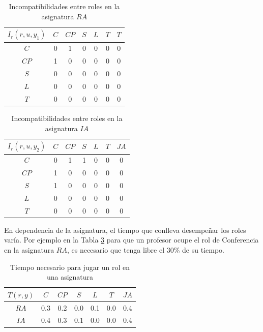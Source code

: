 \begin{table}[H]
	\centering
	\caption{Incompatibilidades entre roles en la asignatura $RA$}\label{ier1-carga}
	\begin{tabular}{|c|c|c|c|c|c|c|}
		\hline
		$I_r(r,u,y_1)$  & $C$ & $CP$& $S$ & $L$ & $T$ & $T$  \\ \hline
		$C$  	   		&  0  &  1  &  0  &  0  & 0 & 0	\\ \hline
		$CP$ 	   		&  1  &  0  &  0  &  0  & 0 & 0	\\ \hline
		$S$  	   		&  0  &  0  &  0  &  0  & 0 & 0	\\ \hline
		$L$  	   		&  0  &  0  &  0  &  0  & 0 & 0	\\ \hline
		$T$  	   		&  0  &  0  &  0  &  0  & 0 & 0	\\ \hline
	\end{tabular}
\end{table}

\begin{table}[H]
	\centering
	\caption{Incompatibilidades entre roles en la asignatura $IA$}\label{ier2-carga}
	\begin{tabular}{|c|c|c|c|c|c|c|}
		\hline
		$I_r(r,u,y_2)$  & $C$ & $CP$& $S$ & $L$ & $T$ & $JA$   \\ \hline
		$C$  	   		&  0  &  1  &  1  &  0  & 0 & 0	\\ \hline
		$CP$ 	   		&  1  &  0  &  0  &  0  & 0 & 0	\\ \hline
		$S$  	   		&  1  &  0  &  0  &  0  & 0 & 0	\\ \hline
		$L$  	   		&  0  &  0  &  0  &  0  & 0 & 0	\\ \hline
		$T$  	   		&  0  &  0  &  0  &  0  & 0 & 0	\\ \hline
	\end{tabular}
\end{table}

En dependencia de la asignatura, el tiempo que conlleva desempeñar los roles varía. Por ejemplo en la Tabla \ref{tr-carga} para que un profesor ocupe el rol de Conferencia en la asignatura $RA$, es necesario que tenga libre el 30\% de su tiempo.

\begin{table}[H]
	\centering
	\caption{Tiempo necesario para jugar un rol en una asignatura}\label{tr-carga}
	\begin{tabular}{|c|c|c|c|c|c|c|}
		\hline
		$T(r,y)$ & $C$ & $CP$ & $S$ & $L$ & $T$ & $JA$   \\ \hline
		$RA$    & 0.3 &  0.2 & 0.0 & 0.1 & 0.0  & 0.4  \\ \hline
		$IA$     & 0.4 &  0.3 & 0.1 & 0.0 & 0.0  & 0.4  \\ \hline
	\end{tabular}
\end{table}

